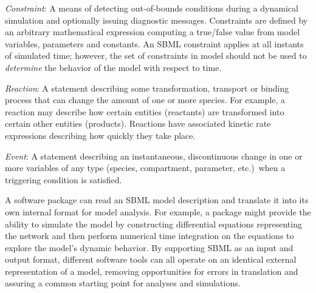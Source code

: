 \begin{description}
\item \emph{Constraint}: A means of detecting out-of-bounds
  conditions during a dynamical simulation and optionally issuing
  diagnostic messages.  Constraints are defined by an arbitrary
  mathematical expression computing a true/false value from model
  variables, parameters and constants.  An SBML constraint applies
  at all instants of simulated time; however, the set of
  constraints in model should not be used to \emph{determine} the
  behavior of the model with respect to time.
  
\item \emph{Reaction}: A statement describing some transformation,
  transport or binding process that can change the amount of one
  or more species.  For example, a reaction may describe how
  certain entities (reactants) are transformed into certain other
  entities (products).  Reactions have associated kinetic rate
  expressions describing how quickly they take place.
  
\item \emph{Event}: A statement describing an instantaneous,
  discontinuous change in one or more variables of any type
  (species, compartment, parameter, etc.)\ when a triggering
  condition is satisfied.

\end{description}

A software package can read an SBML model description and
translate it into its own internal format for model analysis.  For
example, a package might provide the ability to simulate the model
by constructing differential equations representing the network
and then perform numerical time integration on the equations to
explore the model's dynamic behavior.  By supporting SBML as an
input and output format, different software tools can all operate
on an identical external representation of a model, removing
opportunities for errors in translation and assuring a common
starting point for analyses and simulations.
